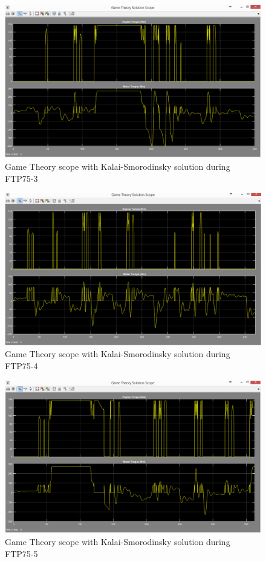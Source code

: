 \begin{figure}[h]
\centering
\includegraphics[scale=0.45]{figures/KalaiSmorodinsky/FTP75-3/gameTheory25Juni}
\caption{Game Theory scope with Kalai-Smorodinsky solution during FTP75-3}
\label{fig:gtks3}
\end{figure}

\begin{figure}[h]
\centering
\includegraphics[scale=0.45]{figures/KalaiSmorodinsky/FTP75-4/gameTheory25Juni}
\caption{Game Theory scope with Kalai-Smorodinsky solution during FTP75-4}
\label{fig:gtks4}
\end{figure}


\begin{figure}[h]
\centering
\includegraphics[scale=0.45]{figures/KalaiSmorodinsky/FTP75-5/gameTheory26Juni}
\caption{Game Theory scope with Kalai-Smorodinsky solution during FTP75-5}
\label{fig:gtks5}
\end{figure}
